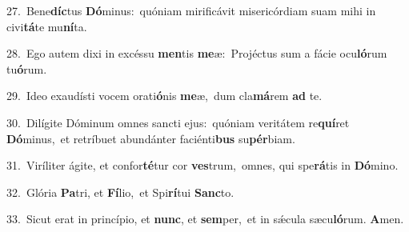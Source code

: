 {\numbfont\textcolor{\numbcolor}{27.}}~Bene\-\textbf{díc}\-tus \textbf{Dó}\-minus:~\star quóniam mirificávit misericórdiam suam mihi in civi\-\textbf{tá}\-te mu\-\textbf{ní}\-ta.\par
{\numbfont\textcolor{\numbcolor}{28.}}~Ego autem dixi in excéssu \textbf{men}\-tis \textbf{me}\-æ:~\star Projéctus sum a fácie ocu\-\textbf{ló}\-rum tu\-\textbf{ó}\-rum.\par
{\numbfont\textcolor{\numbcolor}{29.}}~Ideo exaudísti vocem orati\-\textbf{ó}\-nis \textbf{me}\-æ,~\star dum cla\-\textbf{má}\-rem \textbf{ad} te.\par
{\numbfont\textcolor{\numbcolor}{30.}}~Dilígite Dóminum omnes sancti ejus:~\dagger quóniam veritátem re\-\textbf{quí}\-ret \textbf{Dó}\-minus,~\star et retríbuet abundánter faciénti\textbf{bus} su\-\textbf{pér}\-biam.\par
{\numbfont\textcolor{\numbcolor}{31.}}~Viríliter ágite, et confor\-\textbf{té}\-tur cor \textbf{ves}\-trum,~\star omnes, qui spe\-\textbf{rá}\-tis in \textbf{Dó}\-mino.\par
{\numbfont\textcolor{\numbcolor}{32.}}~Glória \textbf{Pa}\-tri, et \textbf{Fí}\-lio,~\star et Spi\-\textbf{rí}\-tui \textbf{Sanc}\-to.\par
{\numbfont\textcolor{\numbcolor}{33.}}~Sicut erat in princípio, et \textbf{nunc}\-, et \textbf{sem}\-per,~\star et in sǽcula sæcu\-\textbf{ló}\-rum. \textbf{A}\-men.\par

